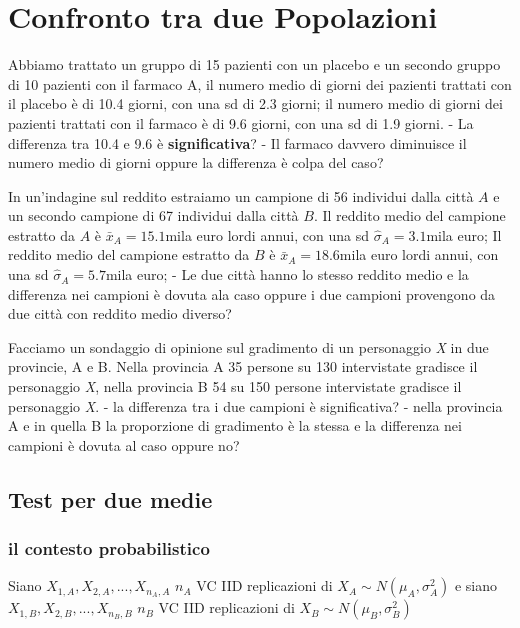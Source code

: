 \documentclass[
  11pt,
]{book}
\theoremstyle{mytheoremstyle}
\theoremstyle{mydefstyle}
\begin{document}
\normalsize

\chapter{Confronto tra due Popolazioni}\label{confronto-tra-due-popolazioni}

Abbiamo trattato un gruppo di 15 pazienti con un placebo e un secondo gruppo di 10 pazienti con il farmaco A, il numero medio di giorni dei pazienti trattati con il placebo è di 10.4 giorni, con una sd di 2.3 giorni; il numero medio di giorni dei pazienti trattati con il farmaco è di 9.6 giorni, con una sd di 1.9 giorni.
- La differenza tra 10.4 e 9.6 è \textbf{significativa}?
- Il farmaco davvero diminuisce il numero medio di giorni oppure la differenza è colpa del caso?

In un'indagine sul reddito estraiamo un campione di 56 individui dalla città \(A\) e un secondo campione di 67 individui dalla città \(B\).
Il reddito medio del campione estratto da \(A\) è \(\bar x_A=15.1\)mila euro lordi annui, con una sd \(\hat\sigma_A=3.1\)mila euro; Il reddito medio del campione estratto da \(B\) è \(\bar x_A=18.6\)mila euro lordi annui, con una sd \(\hat\sigma_A=5.7\)mila euro;
- Le due città hanno lo stesso reddito medio e la differenza nei campioni è dovuta ala caso oppure i due campioni provengono da due città con reddito medio diverso?

Facciamo un sondaggio di opinione sul gradimento di un personaggio \emph{X} in due provincie, A e B. Nella provincia A 35 persone su 130 intervistate gradisce il personaggio \emph{X}, nella provincia B 54 su 150 persone intervistate gradisce il personaggio \emph{X}.
- la differenza tra i due campioni è significativa?
- nella provincia A e in quella B la proporzione di gradimento è la stessa e la differenza nei campioni è dovuta al caso oppure no?

\section{Test per due medie}\label{test-per-due-medie}

\subsection{il contesto probabilistico}\label{il-contesto-probabilistico-1}

Siano \(X_{1,A},X_{2,A},...,X_{n_A,A}\) \(n_A\) VC IID replicazioni di \(X_A\sim N(\mu_A,\sigma_A^2)\) e siano \(X_{1,B},X_{2,B},...,X_{n_B,B}\) \(n_B\) VC IID replicazioni di \(X_B\sim N(\mu_B,\sigma_B^2)\)
\end{document}
